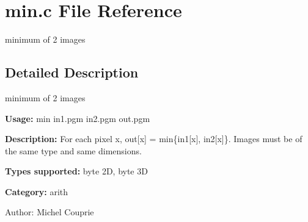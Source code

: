 \section{min.c File Reference}
\label{min_8c}
minimum of 2 images 



\subsection{Detailed Description}
minimum of 2 images 

{\bf Usage:} min in1.pgm in2.pgm out.pgm

{\bf Description:} For each pixel x, out[x] = min\{in1[x], in2[x]\}. Images must be of the same type and same dimensions.

{\bf Types supported:} byte 2D, byte 3D

{\bf Category:} arith

\begin{Desc}
\item[Author:]Michel Couprie \end{Desc}
